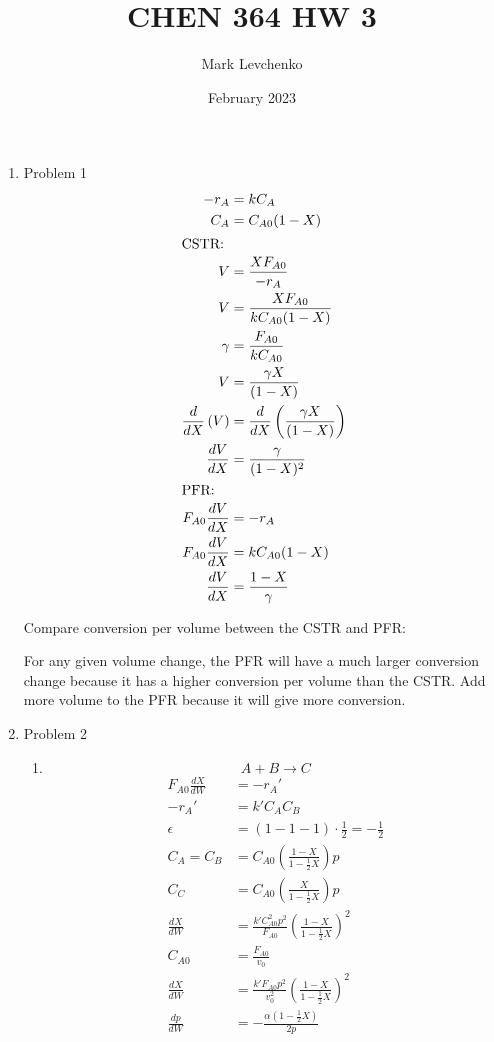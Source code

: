 \documentclass[12pt]{article}
\title{CHEN 364 HW 3}
\author{Mark Levchenko}
\date{February 2023}
\begin{document}
\begin{enumerate}
 
\newpage
    \item Problem 1
    \begin{align*}
        -r_A &= k C_A \\
        C_A &= C_{A0} (1 - X) \\
        \intertext{CSTR:}
        V &= \frac{XF_{A0}}{-r_A} \\
        V &= \frac{XF_{A0}}{k C_{A0} (1 - X)} \\
        \gamma &= \frac{F_{A0}}{k C_{A0}} \\
        V &= \frac{\gamma X}{(1 - X)} \\
        \frac{d}{dX} \left( V \right) &= \frac{d}{dX} \left( \frac{\gamma X}{(1 - X)} \right) \\
        \frac{dV}{dX} &= \frac{\gamma}{(1 - X)^2} \\
        \intertext{PFR:}
         F_{A0} \frac{dV}{dX} &= -r_A \\
        F_{A0} \frac{dV}{dX} &= k C_{A0} (1 - X) \\
        \frac{dV}{dX} &= \frac{1 - X}{\gamma} 
    \end{align*}

    Compare conversion per volume between the CSTR and PFR:

    

    For any given volume change, the PFR will have a much larger conversion change because it has a higher conversion per volume than the CSTR. Add more volume to the PFR because it will give more conversion.



\newpage
    \item Problem 2
    \begin{enumerate}
        \item 
        \[
            A + B \rightarrow C
        \]
        \begin{align*}
            F_{A0} \frac{dX}{dW} &= -r_A' \\
            -r_A' &= k' C_A C_B \\
            \epsilon &= (1 - 1 - 1) \cdot \frac{1}{2} = -\frac{1}{2} \\
            C_A = C_B &= C_{A0} \left( \frac{1 - X}{1 -\frac{1}{2}X} \right) p \\
            C_C &= C_{A0} \left( \frac{X}{1 -\frac{1}{2}X} \right) p \\
            \frac{dX}{dW} &= \frac{k' C_{A0}^2 p^2}{F_{A0}} \left( \frac{1 - X}{1 -\frac{1}{2}X} \right)^2 \\
            C_{A0} &= \frac{F_{A0}}{v_0} \\
            \frac{dX}{dW} &= \frac{k' F_{A0} p^2}{v_0^2} \left( \frac{1 - X}{1 -\frac{1}{2}X} \right)^2 \\
            \frac{dp}{dW} &= -\frac{\alpha \left( 1 -\frac{1}{2}X \right)}{2p} \\
        \end{align*}


\end{enumerate}
\end{enumerate}
\end{document}

